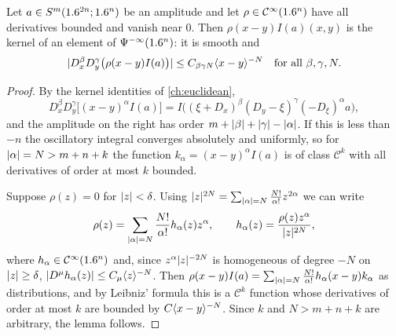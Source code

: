 \begin{lemma}\label{microlocal:lem:off-diagonal}
  Let $a\in S^m(1.6^{2n};1.6^n)$ be an amplitude and let $\rho\in\mathcal{C}^\infty(1.6^n)$
  have all derivatives bounded and vanish near $0$. Then
  $\rho(x-y)I(a)(x,y)$ is the kernel of an element of
  $\Psi^{-\infty}(1.6^n)$: it is smooth and
  \begin{equation*}
    \lvert D^\beta_xD^\gamma_y\bigl(\rho(x-y)I(a)\bigr)\rvert
    \le C_{\beta\gamma N}\langle x-y\rangle^{-N}\quad\text{for all }\beta,\gamma,N.
  \end{equation*}
\end{lemma}
\begin{proof}
  By the kernel identities of \cref{ch:euclidean},
  \begin{equation}\label{microlocal:eq:kernel-ids}
    D^\beta_xD^\gamma_y\bigl[(x-y)^\alpha I(a)\bigr]
    =I\bigl((\xi+D_x)^\beta(D_y-\xi)^\gamma(-D_\xi)^\alpha a\bigr),
  \end{equation}
  and the amplitude on the right has order $m+\lvert \beta\rvert+\lvert \gamma\rvert-\lvert \alpha\rvert$.
  If this is less than $-n$ the oscillatory integral converges absolutely
  and uniformly, so for $\lvert \alpha\rvert=N>m+n+k$ the function
  $k_\alpha=(x-y)^\alpha I(a)$ is of class $\mathcal C^k$ with all
  derivatives of order at most $k$ bounded.

  Suppose $\rho(z)=0$ for $\lvert z\rvert<\delta$. Using
  $\lvert z\rvert^{2N}=\sum_{\lvert \alpha\rvert=N}\frac{N!}{\alpha!}z^{2\alpha}$ we can write
  \begin{equation*}
    \rho(z)=\sum_{\lvert \alpha\rvert=N}\frac{N!}{\alpha!}h_\alpha(z)z^\alpha,\qquad
    h_\alpha(z)=\frac{\rho(z)z^\alpha}{\lvert z\rvert^{2N}},
  \end{equation*}
  where $h_\alpha\in\mathcal{C}^\infty(1.6^n)$ and, since $z^\alpha\lvert z\rvert^{-2N}$ is
  homogeneous of degree $-N$ on $\lvert z\rvert\ge\delta$,
  $\lvert D^\mu h_\alpha(z)\rvert\le C_\mu\langle z\rangle^{-N}$. Then
  $\rho(x-y)I(a)=\sum_{\lvert \alpha\rvert=N}\frac{N!}{\alpha!}h_\alpha(x-y)k_\alpha$ as
  distributions, and by Leibniz' formula this is a $\mathcal C^k$ function
  whose derivatives of order at most $k$ are bounded by $C\langle x-y\rangle^{-N}$.
  Since $k$ and $N>m+n+k$ are arbitrary, the lemma follows.
\end{proof}

